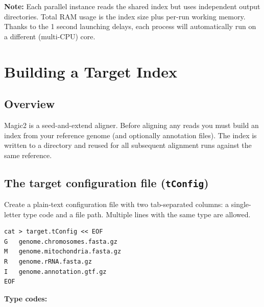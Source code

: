 \documentclass[11pt]{article}
\newcommand{\code}[1]{\texttt{#1}}
\begin{document}
\begin{notebox}
\textbf{Note:} Each parallel instance reads the shared index but uses
independent output directories.  Total RAM usage is the index size plus
per-run working memory.
Thanks to the 1 second launching delays, each process will
automatically run on a different (multi-CPU) core.
\end{notebox}

\section{Building a Target Index}

\subsection{Overview}

Magic2 is a seed-and-extend aligner.  Before aligning any reads you must
build an index from your reference genome (and optionally annotation
files).  The index is written to a directory and reused for all subsequent
alignment runs against the same reference.

\subsection{The target configuration file (\code{tConfig})}

Create a plain-text configuration file with two tab-separated columns:
a single-letter type code and a file path.  Multiple lines with the
same type are allowed.

\begin{lstlisting}
cat > target.tConfig << EOF
G	genome.chromosomes.fasta.gz
M	genome.mitochondria.fasta.gz
R	genome.rRNA.fasta.gz
I	genome.annotation.gtf.gz
EOF
\end{lstlisting}

\textbf{Type codes:}
\end{document}
